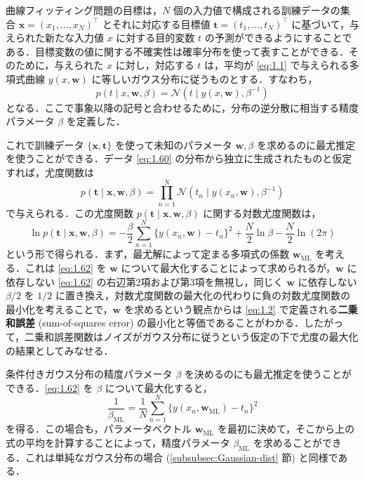 \documentclass[uplatex,a4paper,oneside,openany,dvipdfmx]{jsarticle}
\numberwithin{equation}{section}
\theoremstyle{mystyle} %
\newcommand{\CN}{\mathcal{N}}
\newcommand{\mb}[1]{\mathbf{#1}}
\newcommand{\tb}[1]{\textbf{#1}}
\newcommand{\bs}[1]{\boldsymbol{#1}}
\begin{document}
曲線フィッティング問題の目標は，$N$ 個の入力値で構成される訓練データの集合 $\mb{x} = (x_{1},\ldots,x_{N})^{\top}$ とそれに対応する目標値 $\mb{t} = (t_{1},\ldots,t_{N})^{\top}$ に基づいて，与えられた新たな入力値 $x$ に対する目的変数 $t$ の予測ができるようにすることである．目標変数の値に関する不確実性は確率分布を使って表すことができる．そのために，与えられた $x$ に対し，対応する $t$ は，平均が \eqref{eq:1.1} で与えられる多項式曲線 $y(x,\bs{w})$ に等しいガウス分布に従うものとする．すなわち，
\begin{equation} \label{eq:1.60}
    p(t \mid x,\bs{w},\beta) = \CN(t \mid y(x,\bs{w}),\beta^{-1})
\end{equation}
となる．ここで事象以降の記号と合わせるために，分布の逆分散に相当する精度パラメータ $\beta$ を定義した．

これで訓練データ $\{\mb{x},\mb{t}\}$ を使って未知のパラメータ $\bs{w},\beta$ を求めるのに最尤推定を使うことができる．データ \eqref{eq:1.60} の分布から独立に生成されたものと仮定すれば，尤度関数は
\begin{equation} \label{eq:1.61}
    p(\mb{t} \mid \mb{x},\bs{w},\beta) = \prod_{n=1}^{N} \CN(t_{n} \mid y(x_{n},\bs{w}),\beta^{-1})
\end{equation}
で与えられる．この尤度関数 $p(\mb{t} \mid \mb{x},\bs{w},\beta)$ に関する対数尤度関数は，
\begin{equation} \label{eq:1.62}
    \ln p(\mb{t} \mid \mb{x},\bs{w},\beta) = -\frac{\beta}{2} \sum_{n=1}^{N} \{y(x_{n},\bs{w}) - t_{n}\}^{2} + \frac{N}{2} \ln \beta - \frac{N}{2} \ln (2\pi)
\end{equation}
という形で得られる．まず，最尤解によって定まる多項式の係数 $\bs{w}_{\text{ML}}$ を考える．これは \eqref{eq:1.62} を $\bs{w}$ について最大化することによって求められるが，$\bs{w}$ に依存しない \eqref{eq:1.62} の右辺第2項および第3項を無視し，同じく $\bs{w}$ に依存しない $\beta/2$ を $1/2$ に置き換え，対数尤度関数の最大化の代わりに負の対数尤度関数の最小化を考えることで，$\bs{w}$ を求めるという観点からは \eqref{eq:1.2} で定義される\tb{二乗和誤差} (sum-of-squares error) の最小化と等価であることがわかる．したがって，二乗和誤差関数はノイズがガウス分布に従うという仮定の下で尤度の最大化の結果としてみなせる．

条件付きガウス分布の精度パラメータ $\beta$ を決めるのにも最尤推定を使うことができる．\eqref{eq:1.62} を $\beta$ について最大化すると，
\begin{equation} \label{eq:1.63}
    \frac{1}{\beta_{\text{ML}}} = \frac{1}{N} \sum_{n=1}^{N} \{y(x_{n},\bs{w}_{\text{ML}}) - t_{n}\}^{2}
\end{equation}
を得る．この場合も，パラメータベクトル $\bs{w}_{\text{ML}}$ を最初に決めて，そこから上の式の平均を計算することによって，精度パラメータ $\beta_{\text{ML}}$ を求めることができる．これは単純なガウス分布の場合 (\ref{subsubsec:Gaussian-dist} 節) と同様である．
\end{document}
